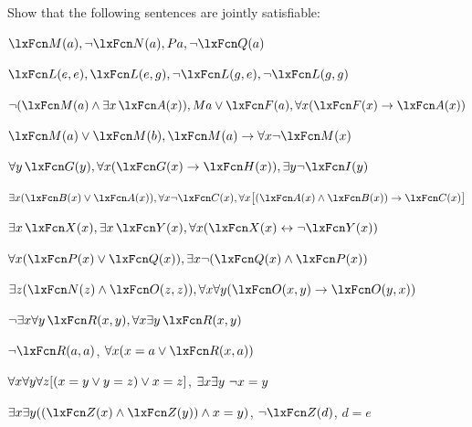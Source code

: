 \problempart
Show that the following sentences are jointly satisfiable:
\begin{compactlist}
\item $\atom{M}{a}, \enot \atom{N}{a}, Pa, \enot \atom{Q}{a}$
\item $\atom{L}{e,e}, \atom{L}{e,g}, \enot \atom{L}{g,e}, \enot \atom{L}{g,g}$
\item $\enot (\atom{M}{a} \eand \exists x\,\atom{A}{x}), Ma \eor \atom{F}{a}, \forall x(\atom{F}{x} \eif \atom{A}{x})$
\item $\atom{M}{a} \eor \atom{M}{b}, \atom{M}{a} \eif \forall x \enot \atom{M}{x}$
\item $\forall y\,\atom{G}{y}, \forall x (\atom{G}{x} \eif \atom{H}{x}), \exists y \enot \atom{I}{y}$
\item $\exists x(\atom{B}{x} \eor \atom{A}{x}), \forall x \enot \atom{C}{x}, \forall x\bigl[(\atom{A}{x} \eand \atom{B}{x}) \eif \atom{C}{x}\bigr]$
\item $\exists x\,\atom{X}{x}, \exists x\,\atom{Y}{x}, \forall x(\atom{X}{x} \eiff \enot \atom{Y}{x})$
\item $\forall x(\atom{P}{x} \eor \atom{Q}{x}), \exists x\enot(\atom{Q}{x} \eand \atom{P}{x})$
\item $\exists z(\atom{N}{z} \eand \atom{O}{z,z}), \forall x\forall y(\atom{O}{x,y} \eif \atom{O}{y,x})$
\item $\enot \exists x \forall y\,\atom{R}{x,y}, \forall x \exists y\,\atom{R}{x,y}$
\item $\enot \atom{R}{a,a}$, $\forall x (x=a \eor \atom{R}{x,a})$

\item $\forall x\forall y\forall z[(x=y \vee y=z )\vee x=z]$, $\exists x\exists y\ \neg x= y$

\item $\exists x\exists y((\atom{Z}{x} \eand \atom{Z}{y} )\eand x=y)$, $\enot \atom{Z}{d}$, $d=e$
\end{compactlist}

